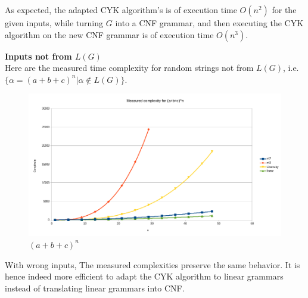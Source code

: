 \documentclass[]{article}
\begin{document}
\begin{multicols}{2}
As expected, the adapted CYK algorithm's is of execution time $O(n^2)$ for the given inputs, while
turning $G$ into a CNF grammar, and then executing the CYK algorithm on the new
CNF grammar is of execution time $O(n^3)$.
\\

\end{multicols}
\newpage
\textbf{Inputs not from $L(G)$}\\
Here are the measured time complexity for random strings not from $L(G)$, i.e. $\{\alpha=(a+b+c)^n|\alpha\notin L(G)\}$.\\

\begin{figure}[h]
  \label{fig:plr}
  \includegraphics[width=\textwidth]{linear/complexity_random_abc}
  \caption{$(a+b+c)^n$}
\end{figure}


\begin{multicols}{2}
With wrong inputs, The measured complexities preserve the same behavior. It is
hence indeed more efficient to adapt the CYK algorithm to linear grammars
instead of translating linear grammars into CNF.
\end{multicols}
\end{document}
